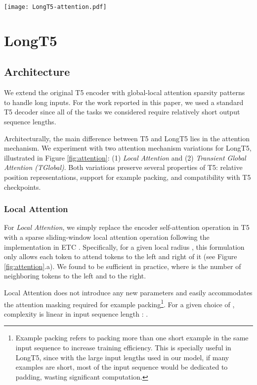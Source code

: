 \documentclass[11pt]{article}
\begin{document}
\begin{figure*}[t!]
	\texttt{[image: LongT5-attention.pdf]}
	\centering
	\caption{Illustration of the two attention mechanisms we experimented with in LongT5.}
	\label{fig:attention}
\end{figure*}


\section{LongT5}\label{sec:longt5}
\subsection{Architecture}
We extend the original T5 encoder with global-local attention sparsity patterns~\cite{etc,bigbird} to handle long inputs. For the work reported in this paper, we used a standard T5 decoder since all of the tasks we considered require relatively short output sequence lengths.

Architecturally, the main difference between T5 and LongT5 lies in the attention mechanism. We experiment with two attention mechanism variations for LongT5, illustrated in Figure \ref{fig:attention}: (1) \emph{Local Attention} and (2) \emph{Transient Global Attention (TGlobal)}.  Both variations preserve several properties of T5: relative position representations, support for example packing, and compatibility with T5 checkpoints.



\subsubsection{Local Attention}
For {\em Local Attention}, we simply replace the encoder self-attention operation in T5 with a sparse sliding-window local attention operation following the implementation in ETC \cite{etc}.  Specifically, for a given local radius , this formulation only allows each token to attend  tokens to the left and right of it (see Figure \ref{fig:attention}.a).  We found  to be sufficient in practice, where  is the number of neighboring tokens to the left and to the right. 

Local Attention does not introduce any new parameters and easily accommodates the attention masking required for example packing\footnote{Example packing refers to packing more than one short example in the same input sequence to increase training efficiency. This is specially useful in LongT5, since with the large input lengths used in our model, if many examples are short, most of the input sequence would be dedicated to padding, wasting significant computation.}. For a given choice of , complexity is linear in input sequence length : .
\end{document}

